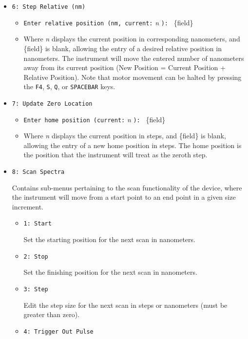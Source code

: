 \documentclass{article}
\begin{document}
\begin{itemize}
\begin{itemize}
    \end{itemize}
    \item \verb|6: Step Relative (nm)|
    \begin{itemize}
        \item \verb|Enter relative position (nm, current:| \emph{n} \verb|): | \{field\}
        \item Where \emph{n} displays the current position in corresponding nanometers, and \{field\} is blank, allowing the entry of a desired relative position in nanometers. The instrument will move the entered number of nanometers away from its current position (New Position = Current Position + Relative Position). Note that motor movement can be halted by pressing the \verb|F4|, \verb|S|, \verb|Q|, or \verb|SPACEBAR| keys.
    \end{itemize}
    \item \verb|7: Update Zero Location|
    \begin{itemize}
        \item \verb|Enter home position (current:| \emph{n} \verb|): | \{field\}
        \item Where \emph{n} displays the current position in steps, and \{field\} is blank, allowing the entry of a new home position in steps. The home position is the position that the instrument will treat as the zeroth step.
    \end{itemize}
    \item \verb|8: Scan Spectra|
    
    Contains sub-menus pertaining to the scan functionality of the device, where the instrument will move from a start point to an end point in a given size increment.

    \begin{itemize}
        \item \verb|1: Start|

        Set the starting position for the next scan in nanometers.

        \item \verb|2: Stop|

        Set the finishing position for the next scan in nanometers.

        \item \verb|3: Step|

        Edit the step size for the next scan in steps or nanometers (must be greater than zero).

        \item \verb|4: Trigger Out Pulse|


\end{itemize}
\end{itemize}
\end{document}
